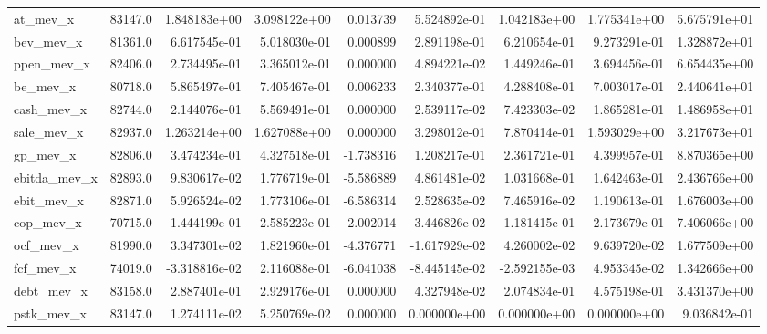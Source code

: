 \documentclass[10pt]{article}
\begin{document}
\begin{landscape}
\begin{longtable}{lrrrrrrrr}
at\_mev\_x                &   83147.0 &  1.848183e+00 &  3.098122e+00 &      0.013739 &  5.524892e-01 &  1.042183e+00 &  1.775341e+00 &  5.675791e+01 \\
bev\_mev\_x               &   81361.0 &  6.617545e-01 &  5.018030e-01 &      0.000899 &  2.891198e-01 &  6.210654e-01 &  9.273291e-01 &  1.328872e+01 \\
ppen\_mev\_x              &   82406.0 &  2.734495e-01 &  3.365012e-01 &      0.000000 &  4.894221e-02 &  1.449246e-01 &  3.694456e-01 &  6.654435e+00 \\
be\_mev\_x                &   80718.0 &  5.865497e-01 &  7.405467e-01 &      0.006233 &  2.340377e-01 &  4.288408e-01 &  7.003017e-01 &  2.440641e+01 \\
cash\_mev\_x              &   82744.0 &  2.144076e-01 &  5.569491e-01 &      0.000000 &  2.539117e-02 &  7.423303e-02 &  1.865281e-01 &  1.486958e+01 \\
sale\_mev\_x              &   82937.0 &  1.263214e+00 &  1.627088e+00 &      0.000000 &  3.298012e-01 &  7.870414e-01 &  1.593029e+00 &  3.217673e+01 \\
gp\_mev\_x                &   82806.0 &  3.474234e-01 &  4.327518e-01 &     -1.738316 &  1.208217e-01 &  2.361721e-01 &  4.399957e-01 &  8.870365e+00 \\
ebitda\_mev\_x            &   82893.0 &  9.830617e-02 &  1.776719e-01 &     -5.586889 &  4.861481e-02 &  1.031668e-01 &  1.642463e-01 &  2.436766e+00 \\
ebit\_mev\_x              &   82871.0 &  5.926524e-02 &  1.773106e-01 &     -6.586314 &  2.528635e-02 &  7.465916e-02 &  1.190613e-01 &  1.676003e+00 \\
cop\_mev\_x               &   70715.0 &  1.444199e-01 &  2.585223e-01 &     -2.002014 &  3.446826e-02 &  1.181415e-01 &  2.173679e-01 &  7.406066e+00 \\
ocf\_mev\_x               &   81990.0 &  3.347301e-02 &  1.821960e-01 &     -4.376771 & -1.617929e-02 &  4.260002e-02 &  9.639720e-02 &  1.677509e+00 \\
fcf\_mev\_x               &   74019.0 & -3.318816e-02 &  2.116088e-01 &     -6.041038 & -8.445145e-02 & -2.592155e-03 &  4.953345e-02 &  1.342666e+00 \\
debt\_mev\_x              &   83158.0 &  2.887401e-01 &  2.929176e-01 &      0.000000 &  4.327948e-02 &  2.074834e-01 &  4.575198e-01 &  3.431370e+00 \\
pstk\_mev\_x              &   83147.0 &  1.274111e-02 &  5.250769e-02 &      0.000000 &  0.000000e+00 &  0.000000e+00 &  0.000000e+00 &  9.036842e-01 \\

\end{longtable}
\end{landscape}
\end{document}
